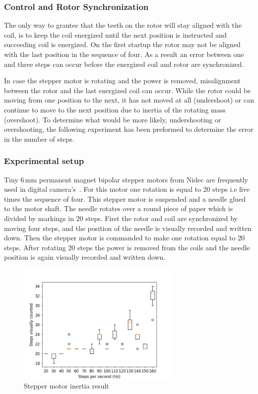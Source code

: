 \subsubsection{Control and Rotor Synchronization}

The only way to grantee that the teeth on the rotor will stay aligned with the coil, is to keep the coil energized until the next position is instructed and succeeding coil is energized. 
On the first startup the rotor may not be aligned with the last position in the sequence of four.
As a result an error between one and three steps can occur before the energized coil and rotor are synchronized.

In case the stepper motor is rotating and the power is removed, misalignment between the rotor and the last energized coil can occur.
While the rotor could be moving from one position to the next, it has not moved at all (undershoot) or can continue to move to the next position due to inertia of the rotating mass (overshoot). 
To determine what would be more likely, undershooting or overshooting, the following experiment has been preformed to determine the error in the number of steps.

\subsubsection{Experimental setup}

Tiny 6\,mm permanent magnet bipolar stepper motors from Nidec are frequently used in digital camera's~\cite{nidec_stepper_2017}.
For this motor one rotation is equal to 20 steps i.e five times the sequence of four.
This stepper motor is suspended and a needle glued to the motor shaft.
The needle rotates over a round piece of paper which is divided by markings in 20 steps.%
First the rotor and coil are synchronized by moving four steps, and the position of the needle is visually recorded and written down.  
Then the stepper motor is commanded to make one rotation equal to 20 steps.
After rotating 20 steps the power is removed from the coils and the needle position is again visually recorded and written down.

\begin{figure}
	\centering
	\includegraphics[width=0.7\textwidth]{pics/figure_intertia.png}
	\caption{Stepper motor inertia result}
	\label{fig:step_results}
\end{figure}


